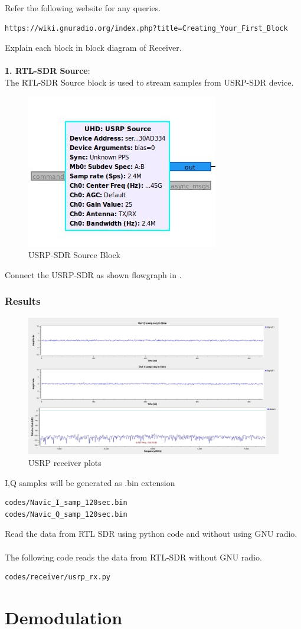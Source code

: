 \documentclass[11pt]{book}
\begin{document}
Refer the following website for any queries.
\begin{lstlisting}
https://wiki.gnuradio.org/index.php?title=Creating_Your_First_Block
\end{lstlisting}
 Explain each block in block diagram of Receiver.\\
	\solution \\
\textbf{1. RTL-SDR Source}:\\
The RTL-SDR Source block is used to stream samples from USRP-SDR device.
\begin{figure}[H]
\centering
\includegraphics[width=0.4\columnwidth]{figs/usrp-sink.jpg}
\caption{USRP-SDR Source Block}
\label{fig:source block}
\end{figure}
Connect the USRP-SDR as shown flowgraph in .\\



\subsection{Results} 
\begin{figure}
\includegraphics[width=0.8\columnwidth]{figs/USRP_results.jpg}
\caption{USRP receiver plots}
\label{fig:plots}
\end{figure}

I,Q samples will be generated as .bin extension

\begin{lstlisting}
codes/Navic_I_samp_120sec.bin
codes/Navic_Q_samp_120sec.bin
\end{lstlisting}

Read the data from RTL SDR using python code and without using GNU radio.
\\
\solution \\
The following code reads the data from RTL-SDR without GNU radio.
\begin{lstlisting}
codes/receiver/usrp_rx.py
\end{lstlisting}
















\chapter{Demodulation}


\end{document}
